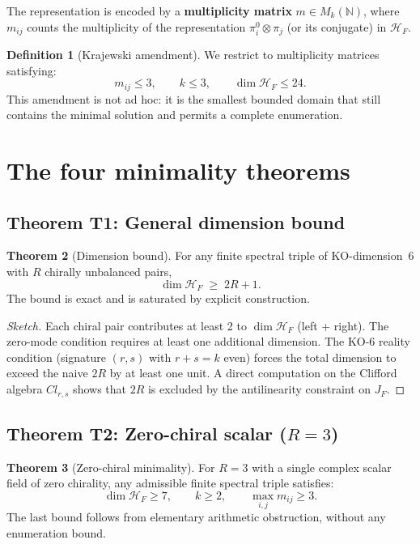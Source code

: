\documentclass[11pt,a4paper]{article}
\theoremstyle{definition}
\newtheorem{theorem}{Theorem}[section]
\newtheorem{definition}[theorem]{Definition}
\begin{document}
The representation is encoded by a \textbf{multiplicity matrix} $m \in M_k(\mathbb{N})$, where $m_{ij}$ counts the multiplicity of the representation $\pi_i^0 \otimes \pi_j$ (or its conjugate) in $\mathcal{H}_F$.

\begin{definition}[Krajewski amendment]
We restrict to multiplicity matrices satisfying:
\[
m_{ij} \leq 3, \qquad k \leq 3, \qquad \dim \mathcal{H}_F \leq 24.
\]
This amendment is not ad hoc: it is the smallest bounded domain that still contains the minimal solution and permits a complete enumeration.
\end{definition}

\section{The four minimality theorems}

\subsection{Theorem T1: General dimension bound}

\begin{theorem}[Dimension bound]
For any finite spectral triple of KO-dimension~6 with $R$ chirally unbalanced pairs,
\[
\dim \mathcal{H}_F \;\geq\; 2R + 1.
\]
The bound is exact and is saturated by explicit construction.
\end{theorem}

\begin{proof}[Sketch]
Each chiral pair contributes at least 2 to $\dim \mathcal{H}_F$ (left + right). The zero-mode condition requires at least one additional dimension. The KO-6 reality condition (signature $(r,s)$ with $r+s=k$ even) forces the total dimension to exceed the naive $2R$ by at least one unit. A direct computation on the Clifford algebra $Cl_{r,s}$ shows that $2R$ is excluded by the antilinearity constraint on $J_F$.
\end{proof}

\subsection{Theorem T2: Zero-chiral scalar ($R=3$)}

\begin{theorem}[Zero-chiral minimality]
For $R=3$ with a single complex scalar field of zero chirality, any admissible finite spectral triple satisfies:
\[
\dim \mathcal{H}_F \geq 7, \qquad k \geq 2, \qquad \max_{i,j} m_{ij} \geq 3.
\]
The last bound follows from elementary arithmetic obstruction, without any enumeration bound.
\end{theorem}
\end{document}
